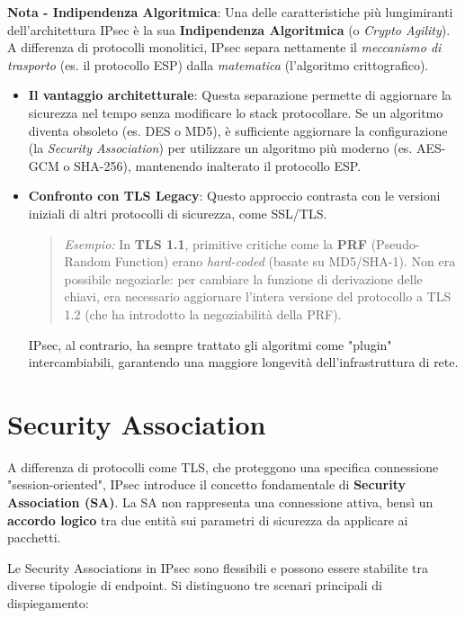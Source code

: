 \documentclass[a4paper, 11pt]{article}
\begin{document}
\textbf{Nota - Indipendenza Algoritmica}:
Una delle caratteristiche più lungimiranti dell'architettura IPsec è la sua \textbf{Indipendenza Algoritmica} (o \textit{Crypto Agility}).
A differenza di protocolli monolitici, IPsec separa nettamente il \textit{meccanismo di trasporto} (es. il protocollo ESP) dalla \textit{matematica} (l'algoritmo crittografico).

\begin{itemize}
    \item \textbf{Il vantaggio architetturale}: Questa separazione permette di aggiornare la sicurezza nel tempo senza modificare lo stack protocollare. Se un algoritmo diventa obsoleto (es. DES o MD5), è sufficiente aggiornare la configurazione (la \textit{Security Association}) per utilizzare un algoritmo più moderno (es. AES-GCM o SHA-256), mantenendo inalterato il protocollo ESP.

    \item \textbf{Confronto con TLS Legacy}: Questo approccio contrasta con le versioni iniziali di altri protocolli di sicurezza, come SSL/TLS.
    \begin{quote}
    \textit{Esempio:} In \textbf{TLS 1.1}, primitive critiche come la \textbf{PRF} (Pseudo-Random Function) erano \textit{hard-coded} (basate su MD5/SHA-1). Non era possibile negoziarle: per cambiare la funzione di derivazione delle chiavi, era necessario aggiornare l'intera versione del protocollo a TLS 1.2 (che ha introdotto la negoziabilità della PRF).
    \end{quote}
    IPsec, al contrario, ha sempre trattato gli algoritmi come "plugin" intercambiabili, garantendo una maggiore longevità dell'infrastruttura di rete.
\end{itemize}

\section{Security Association}

A differenza di protocolli come TLS, che proteggono una specifica connessione "session-oriented", IPsec introduce il concetto fondamentale di \textbf{Security Association (SA)}.
La SA non rappresenta una connessione attiva, bensì un \textbf{accordo logico} tra due entità sui parametri di sicurezza da applicare ai pacchetti.

Le Security Associations in IPsec sono flessibili e possono essere stabilite tra diverse tipologie di endpoint. Si distinguono tre scenari principali di dispiegamento:
\end{document}
